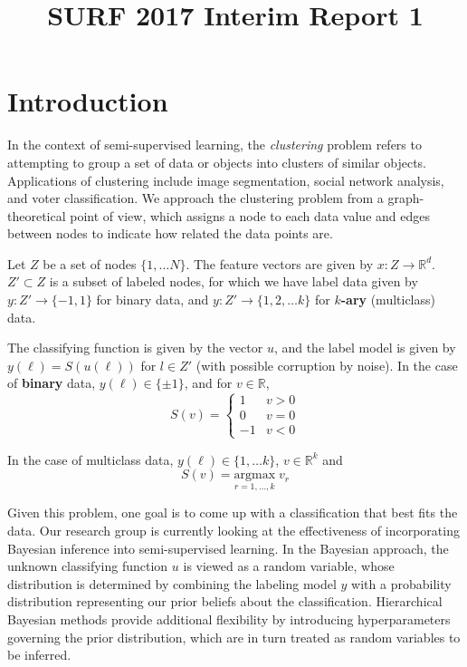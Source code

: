 \documentclass{siamart1116}
\title{SURF 2017 Interim Report 1}
\author{\TheAuthors}
\date{}
\begin{document}
\maketitle
\setlength{\unitlength}{1in}
\setlength{\parindent}{0in}

\section{Introduction}
In the context of semi-supervised learning, the \textit{clustering} problem refers to attempting to group a set of data or objects into clusters of similar objects. Applications of clustering include image segmentation, social network analysis, and voter classification. We approach the clustering problem from a graph-theoretical point of view, which assigns a node to each data value and edges between nodes to indicate how related the data points are.

Let $Z$ be a set of nodes $\{1, \ldots N\}$. The feature vectors are given by $x : Z \rightarrow \mathbb{R}^d$. $Z' \subset Z$ is a subset of labeled nodes, for which we have label data given by $y : Z' \to \{-1, 1\}$ for binary data, and $y : Z' \to \{1,2,\ldots k\}$ for {\bf $k$-ary} (multiclass) data.


The classifying function is given by the vector $u$, and the label model is given by $y(\ell) = S(u(\ell))$ for $l \in Z'$ (with possible corruption by noise). In the case of {\bf binary} data, $y(\ell) \in \{\pm 1\}$, and for $v \in \mathbb{R}$,
\[
S(v) = \begin{cases}
1 & v>0\\
0 & v=0\\
-1 & v<0
\end{cases}
\]

In the case of multiclass data, $y(\ell) \in \{1, \ldots k\}$, $v \in \mathbb{R}^k$ and
\[
S(v) = \underset{r =1,\ldots,k}{\mathrm{argmax}}\;v_r
\]

Given this problem, one goal is to come up with a classification that best fits the data. Our research group is currently looking at the effectiveness of incorporating Bayesian inference into semi-supervised learning. In the Bayesian approach, the unknown classifying function $u$ is viewed as a random variable, whose distribution is determined by combining the labeling model $y$ with a probability distribution representing our prior beliefs about the classification. Hierarchical Bayesian methods provide additional flexibility by introducing hyperparameters governing the prior distribution, which are in turn treated as random variables to be inferred.
\end{document}
